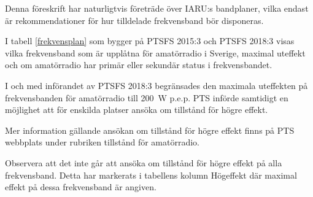 Denna föreskrift har naturligtvis företräde över IARU:s bandplaner, vilka
endast är rekommendationer för hur tilldelade frekvensband bör disponeras.

I tabell \ref{frekvensplan} som bygger på PTSFS 2015:3 och PTSFS 2018:3 visas
vilka frekvensband som är upplåtna för amatörradio i Sverige, maximal uteffekt
och om amatörradio har primär eller sekundär status i frekvensbandet.

I och med införandet av PTSFS 2018:3 begränsades den maximala uteffekten på
frekvensbanden för amatörradio till \SI{200}{\watt} p.e.p.
PTS införde samtidigt en möjlighet att för enskilda platser ansöka om tillstånd
för högre effekt.

Mer information gällande ansökan om tillstånd för högre effekt finns på PTS
webbplats under rubriken tillstånd för amatörradio.

Observera att det inte går att ansöka om tillstånd för högre effekt på alla
frekvensband. Detta har markerats i tabellens kolumn Högeffekt där maximal
effekt på dessa frekvensband är angiven.

